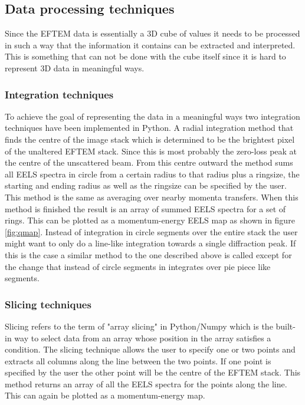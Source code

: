 \subsection{Data processing techniques}
Since the EFTEM data is essentially a 3D cube of values it needs to be processed in such a way that the information it contains can be extracted and interpreted. This is something that can not be done with the cube itself since it is hard to represent 3D data in meaningful ways.

\subsubsection{Integration techniques}
To achieve the goal of representing the data in a meaningful ways two integration techniques have been implemented in Python.
A radial integration method that finds the centre of the image stack which is determined to be the brightest pixel of the unaltered EFTEM stack. Since this is most probably the zero-loss peak at the centre of the unscattered beam.
From this centre outward the method sums all EELS spectra in circle from a certain radius to that radius plus a ringsize, the starting and ending radius as well as the ringsize can be specified by the user.
This method is the same as averaging over nearby momenta transfers.
When this method is finished the result is an array of summed EELS spectra for a set of rings. This can be plotted as a momentum-energy EELS map as shown in figure \ref{fig:qmap}.
Instead of integration in circle segments over the entire stack the user might want to only do a line-like integration towards a single diffraction peak. If this is the case a similar method to the one described above is called except for the change that instead of circle segments in integrates over pie piece like segments.

\subsubsection{Slicing techniques}
Slicing refers to the term of "array slicing" in Python/Numpy\cite{Harris2020} which is the built-in way to select data from an array whose position in the array satisfies a condition. The slicing technique allows the user to specify one or two points and extracts all columns along the line between the two points. If one point is specified by the user the other point will be the centre of the EFTEM stack. This method returns an array of all the EELS spectra for the points along the line. This can again be plotted as a momentum-energy map.

